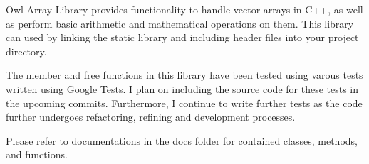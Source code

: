 Owl Array Library provides functionality to handle vector arrays in C++, as well as perform basic arithmetic and mathematical operations on them. This library can used by linking the static library and including header files into your project directory.

The member and free functions in this library have been tested using varous tests written using Google Tests. I plan on including the source code for these tests in the upcoming commits. Furthermore, I continue to write further tests as the code further undergoes refactoring, refining and development processes.

Please refer to documentations in the docs folder for contained classes, methods, and functions. 